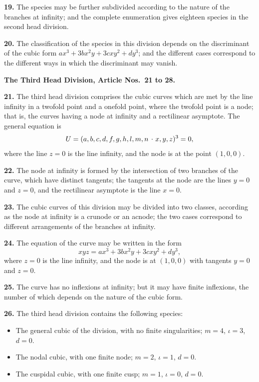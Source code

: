 \documentclass[11pt,a4paper]{article}
\theoremstyle{plain}
\theoremstyle{definition}
\newcommand{\lc}{\kern.17em\raise.5ex\hbox{.}\kern.08em}  %
\begin{document}
\textbf{19.} The species may be further subdivided according to the nature of the branches at infinity; and the complete enumeration gives eighteen species in the second head division.

\textbf{20.} The classification of the species in this division depends on the discriminant of the cubic form $ax^3 + 3bx^2y + 3cxy^2 + dy^3$; and the different cases correspond to the different ways in which the discriminant may vanish.

\bigskip

\noindent\textbf{The Third Head Division, Article Nos.~21 to 28.}

\medskip

\textbf{21.} The third head division comprises the cubic curves which are met by the line infinity in a twofold point and a onefold point, where the twofold point is a node; that is, the curves having a node at infinity and a rectilinear asymptote. The general equation is
\[
U = (a, b, c, d, f, g, h, l, m, n \mathbin{\lc} x, y, z)^3 = 0,
\]
where the line $z = 0$ is the line infinity, and the node is at the point $(1, 0, 0)$.

\textbf{22.} The node at infinity is formed by the intersection of two branches of the curve, which have distinct tangents; the tangents at the node are the lines $y = 0$ and $z = 0$, and the rectilinear asymptote is the line $x = 0$.

\textbf{23.} The cubic curves of this division may be divided into two classes, according as the node at infinity is a crunode or an acnode; the two cases correspond to different arrangements of the branches at infinity.

\textbf{24.} The equation of the curve may be written in the form
\[
xyz = ax^3 + 3bx^2y + 3cxy^2 + dy^3,
\]
where $z = 0$ is the line infinity, and the node is at $(1, 0, 0)$ with tangents $y = 0$ and $z = 0$.

\textbf{25.} The curve has no inflexions at infinity; but it may have finite inflexions, the number of which depends on the nature of the cubic form.

\textbf{26.} The third head division contains the following species:
\begin{itemize}
\item[(1)] The general cubic of the division, with no finite singularities; $m = 4$, $\iota = 3$, $d = 0$.
\item[(2)] The nodal cubic, with one finite node; $m = 2$, $\iota = 1$, $d = 0$.
\item[(3)] The cuspidal cubic, with one finite cusp; $m = 1$, $\iota = 0$, $d = 0$.
\end{itemize}
\end{document}
